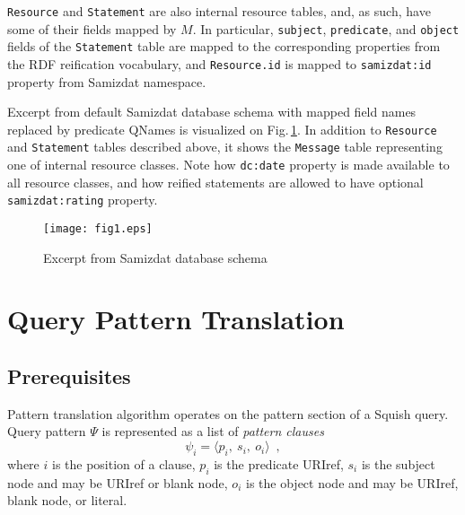 \documentclass{llncs}
\begin{document}
{\tt Resource} and {\tt Statement} are also internal resource tables, and, as
such, have some of their fields mapped by $M$. In particular, {\tt subject},
{\tt predicate}, and {\tt object} fields of the {\tt Statement} table are
mapped to the corresponding properties from the RDF reification vocabulary,
and {\tt Resource.id} is mapped to {\tt samizdat:id} property from Samizdat
namespace.

Excerpt from default Samizdat database schema with mapped field names replaced
by predicate QNames is visualized on Fig.\,\ref{db-schema-figure}. In addition
to {\tt Resource} and {\tt Statement} tables described above, it shows the
{\tt Message} table representing one of internal resource classes. Note how
{\tt dc:date} property is made available to all resource classes, and how
reified statements are allowed to have optional {\tt samizdat:rating}
property.

\begin{figure}
\begin{center}
\texttt{[image: fig1.eps]}
\end{center}
\caption{Excerpt from Samizdat database schema}
\label{db-schema-figure}
\end{figure}


\section{Query Pattern Translation}
%
\subsection{Prerequisites}

Pattern translation algorithm operates on the pattern section of a Squish
query. Query pattern $\Psi$ is represented as a list of \emph{pattern clauses}
\begin{equation}
\psi_i = \langle p_i,~s_i,~o_i \rangle \enspace ,
\end{equation}
where $i$ is the position of a clause, $p_i$ is the predicate URIref, $s_i$ is
the subject node and may be URIref or blank node, $o_i$ is the object node and
may be URIref, blank node, or literal.
\end{document}
